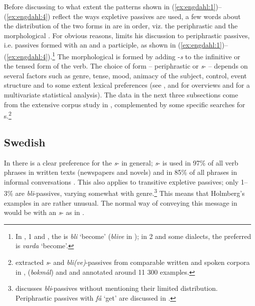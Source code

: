 \documentclass[output=paper]{LSP/langsci}
\begin{document}
Before discussing to what extent the patterns shown in (\ref{ex:engdahl:1})--(\ref{ex:engdahl:4}) reflect the ways expletive passives are used, a few words about the distribution of the two  forms in  are in order, viz. the periphrastic and the morphological . For obvious reasons, \citet{Holmberg2002Expletives} limits his discussion to periphrastic passives, i.e. passives formed with an  and a participle, as shown in (\ref{ex:engdahl:1})--(\ref{ex:engdahl:4}).\footnote{In ,  1 and , the  is \textit{bli} ‘become’ (\textit{blive} in ); in  2 and some  dialects, the preferred  is \textit{varda} ‘become’.} The morphological  is formed by adding -\textit{s} to the infinitive or the tensed form of the verb. The choice of  form – periphrastic  or \textit{s}{}- – depends on several factors such as genre, tense, mood, animacy of the subject, control, event structure and to some extent lexical preferences (see \citealt{Sundman1987}, \citealt{Engdahl1999,Engdahl2006} and \citealt[47--61]{Laanemets2012} for overviews and \citealt{DeCuypereEtAl2014} for a multivariate statistical analysis). The data in the next three subsections come from the extensive corpus study in \citet{Laanemets2012}, complemented by some specific searches for s.\footnote{\citet{Laanemets2012} extracted \textit{s}{}- and \textit{bli(ve)}{}-passives from comparable written and spoken corpora in ,  (\textit{bokmål}) and  and annotated around 11 300  examples.}

\subsection{Swedish} %

In  there is a clear preference for the \textit{s}{}- in general; \textit{s}{}- is used in 97\% of all  verb phrases in written texts (newspapers and novels) and in 85\% of all  phrases in informal conversations \citep[92]{Laanemets2012}. This also applies to transitive expletive passives; only 1–3\% are \textit{bli}{}-passives, varying somewhat with genre.\footnote{\citet[Chapter 3]{Hedlund1992} discusses \textit{bli}{}-passives without mentioning their limited distribution. Periphrastic passives with \textit{få} ‘get’ are discussed in \citet{Larsson2012}.} This means that Holmberg’s examples in  are rather unusual. The normal way of conveying this message in  would be with an \textit{s}{}- as in .
\end{document}

